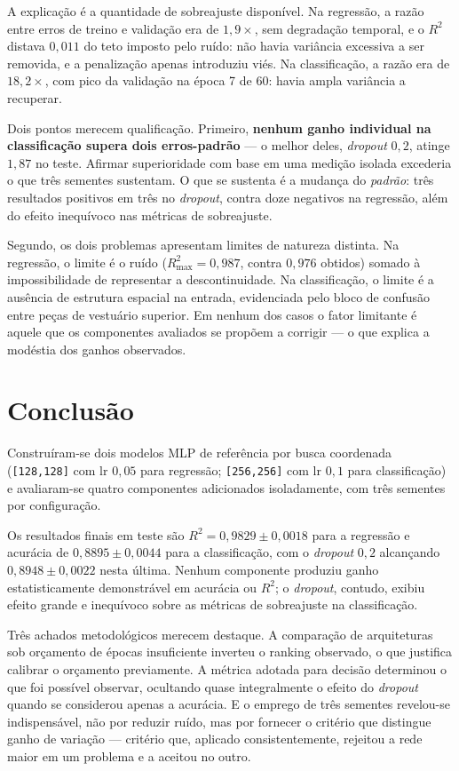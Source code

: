 \documentclass[11pt,a4paper]{article}
\begin{document}
A explicação é a quantidade de sobreajuste disponível. Na regressão, a razão entre erros
de treino e validação era de $1{,}9\times$, sem degradação temporal, e o $R^2$ distava
$0{,}011$ do teto imposto pelo ruído: não havia variância excessiva a ser removida, e a
penalização apenas introduziu viés. Na classificação, a razão era de $18{,}2\times$, com
pico da validação na época 7 de 60: havia ampla variância a recuperar.

Dois pontos merecem qualificação. Primeiro, \textbf{nenhum ganho individual na
classificação supera dois erros-padrão} --- o melhor deles, \emph{dropout} $0{,}2$, atinge
$1{,}87$ no teste. Afirmar superioridade com base em uma medição isolada excederia o que
três sementes sustentam. O que se sustenta é a mudança do \emph{padrão}: três resultados
positivos em três no \emph{dropout}, contra doze negativos na regressão, além do efeito
inequívoco nas métricas de sobreajuste.

Segundo, os dois problemas apresentam limites de natureza distinta. Na regressão, o
limite é o ruído ($R^2_{\max} = 0{,}987$, contra $0{,}976$ obtidos) somado à
impossibilidade de representar a descontinuidade. Na classificação, o limite é a
ausência de estrutura espacial na entrada, evidenciada pelo bloco de confusão entre peças
de vestuário superior. Em nenhum dos casos o fator limitante é aquele que os componentes
avaliados se propõem a corrigir --- o que explica a modéstia dos ganhos observados.

\section{Conclusão}

Construíram-se dois modelos MLP de referência por busca coordenada
(\texttt{[128,128]} com lr $0{,}05$ para regressão; \texttt{[256,256]} com lr $0{,}1$ para
classificação) e avaliaram-se quatro componentes adicionados isoladamente, com três
sementes por configuração.

Os resultados finais em teste são $R^2 = 0{,}9829 \pm 0{,}0018$ para a regressão e
acurácia de $0{,}8895 \pm 0{,}0044$ para a classificação, com o \emph{dropout} $0{,}2$
alcançando $0{,}8948 \pm 0{,}0022$ nesta última. Nenhum componente produziu ganho
estatisticamente demonstrável em acurácia ou $R^2$; o \emph{dropout}, contudo, exibiu
efeito grande e inequívoco sobre as métricas de sobreajuste na classificação.

Três achados metodológicos merecem destaque. A comparação de arquiteturas sob orçamento
de épocas insuficiente inverteu o ranking observado, o que justifica calibrar o orçamento
previamente. A métrica adotada para decisão determinou o que foi possível observar,
ocultando quase integralmente o efeito do \emph{dropout} quando se considerou apenas a
acurácia. E o emprego de três sementes revelou-se indispensável, não por reduzir ruído,
mas por fornecer o critério que distingue ganho de variação --- critério que, aplicado
consistentemente, rejeitou a rede maior em um problema e a aceitou no outro.
\end{document}
